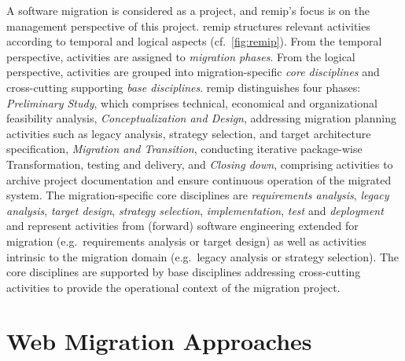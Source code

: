 A software migration is considered as a project, and \gls{remip}'s focus is on the management perspective of this project.
\gls{remip} structures relevant activities according to temporal and logical aspects (cf.~\cref{fig:remip}).
From the temporal perspective, activities are assigned to \emph{migration phases}.
From the logical perspective, activities are grouped into migration-specific \emph{core disciplines} and cross-cutting supporting \emph{base disciplines}.
\gls{remip} distinguishes four phases: \emph{Preliminary Study}, which comprises technical, economical and organizational feasibility analysis, \emph{Conceptualization and Design}, addressing migration planning activities such as legacy analysis, strategy selection, and target architecture specification, \emph{Migration and Transition}, conducting iterative package-wise \gls{Transformation}, testing and delivery, and \emph{Closing down}, comprising activities to archive project documentation and ensure continuous operation of the migrated system.
The migration-specific core disciplines are \emph{requirements analysis}, \emph{legacy analysis}, \emph{target design}, \emph{strategy selection}, \emph{implementation}, \emph{test} and \emph{deployment} and represent activities from (forward) software engineering extended for migration (e.g.~requirements analysis or target design) as well as activities intrinsic to the migration domain (e.g.~legacy analysis or strategy selection).
The core disciplines are supported by base disciplines addressing cross-cutting activities to provide the operational context of the migration project. %

\vspace{-15pt}
\hypertarget{sec:approaches}{%
\section{Web Migration Approaches}\label{sec:approaches}}
\vspace{15pt}

